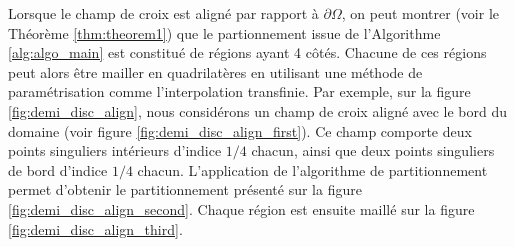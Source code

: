 Lorsque le champ de croix est aligné par rapport à $\partial\Omega$, on peut montrer (voir le Théorème \ref{thm:theorem1}) que le partionnement issue de l'Algorithme \ref{alg:algo_main} est constitué de régions ayant 4 côtés. Chacune de ces régions peut alors être mailler en quadrilatères en utilisant une méthode de paramétrisation comme l'interpolation transfinie. Par exemple, sur la figure \ref{fig:demi_disc_align}, nous considérons un champ de croix aligné avec le bord du domaine (voir figure \ref{fig:demi_disc_align_first}). Ce champ comporte deux points singuliers intérieurs d'indice $1/4$ chacun, ainsi que deux points singuliers de bord d'indice $1/4$ chacun. L'application de l'algorithme de partitionnement permet d'obtenir le partitionnement présenté sur la figure \ref{fig:demi_disc_align_second}. Chaque région est ensuite maillé sur la figure \ref{fig:demi_disc_align_third}.

